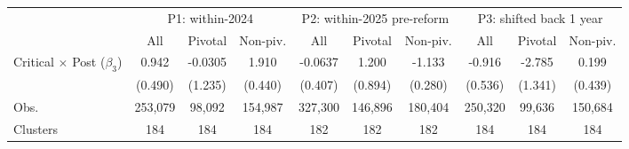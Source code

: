 \begin{tabular}{l c c c c c c c c c}
\toprule
 & \multicolumn{3}{c}{P1: within-2024} & \multicolumn{3}{c}{P2: within-2025 pre-reform} & \multicolumn{3}{c}{P3: shifted back 1 year} \\
\cmidrule(lr){2-4} \cmidrule(lr){5-7} \cmidrule(lr){8-10}
 & All & Pivotal & Non-piv. & All & Pivotal & Non-piv. & All & Pivotal & Non-piv. \\
\midrule

Critical $\times$ Post ($\beta_3$)&       0.942         &     -0.0305         &       1.910\sym{***}&     -0.0637         &       1.200         &      -1.133\sym{***}&      -0.916         &      -2.785\sym{*}  &       0.199         \\
                    &     (0.490)         &     (1.235)         &     (0.440)         &     (0.407)         &     (0.894)         &     (0.280)         &     (0.536)         &     (1.341)         &     (0.439)         \\
\midrule
Obs.                &     253,079         &      98,092         &     154,987         &     327,300         &     146,896         &     180,404         &     250,320         &      99,636         &     150,684         \\
Clusters            &         184         &         184         &         184         &         182         &         182         &         182         &         184         &         184         &         184         \\
\bottomrule
\end{tabular}
